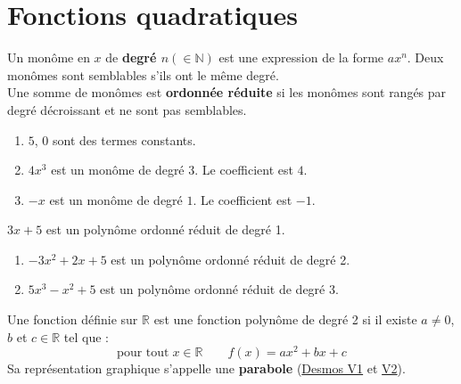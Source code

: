 \documentclass[main.tex]{subfiles}
\begin{document}
 
\cleardoublepage 
{}  
\pagestyle{scrheadings} %
\onehalfspacing 
\chapter{Fonctions quadratiques}

\begin{definition} Un monôme en $x$ de \textbf{degré $n(\in\mathbb{N})$} est une expression de la forme $ax^n$. 
Deux monômes sont semblables s'ils ont le même degré.\\
Une somme de monômes est \textbf{ordonnée réduite} si les monômes sont rangés par degré décroissant et ne sont pas semblables.  
\end{definition}
\begin{example} 
	\begin{enumerate}[leftmargin=*, label=\textbullet]
		\item   $5$, $0$ sont des termes constants.  
	\item   $4x^3$ est un monôme de degré $3$. Le coefficient est $4$.
	\item   $-x$ est un monôme de degré $1$. Le coefficient est $-1$.
\end{enumerate} 
\end{example}
\begin{example}  $3x+5$ est un polynôme ordonné réduit de degré 1.  
\begin{enumerate}[leftmargin=*, label=\textbullet]
	\item $-3x^2+2x+5$ est un polynôme ordonné réduit de degré 2.
	\item $5x^3-x^2+5$ est un polynôme ordonné réduit de degré 3.
\end{enumerate} 
\end{example} 
\vfill 
\begin{definition} Une fonction	définie sur $\mathbb{R}$ 
est une fonction polynôme de degré 2
	si il existe $a\neq0$, $b$ et $c\in\mathbb{R}$ tel que :  
	\setlength{\abovedisplayskip}{3pt}
	\setlength{\belowdisplayskip}{3pt}
	$$\text{pour tout} \;x\in\mathbb{R} \qquad f(x)=ax^2+bx+c$$   
Sa représentation graphique s'appelle une \textbf{parabole} (\href{https://www.desmos.com/calculator/3tknwzoelj}{Desmos V1} et \href{https://www.desmos.com/calculator/8t1vcgdrmr}{V2}). 
\end{definition} 
\end{document}
